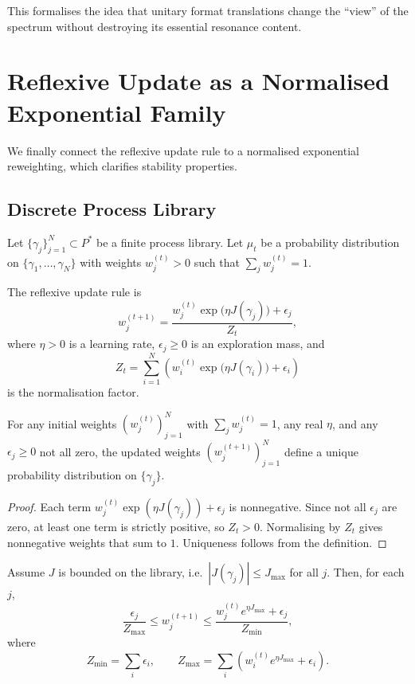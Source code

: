 \documentclass[11pt]{article}
\begin{document}
This formalises the idea that unitary format translations change the ``view'' of the spectrum without destroying its essential resonance content.

\section{Reflexive Update as a Normalised Exponential Family}

We finally connect the reflexive update rule to a normalised exponential reweighting, which clarifies stability properties.

\subsection{Discrete Process Library}

Let $\{\gamma_j\}_{j=1}^N \subset P^\ast$ be a finite process library.
Let $\mu_t$ be a probability distribution on $\{\gamma_1,\dots,\gamma_N\}$ with weights $w_j^{(t)}>0$ such that $\sum_j w_j^{(t)}=1$.

The reflexive update rule is
\[
w_j^{(t+1)} = \frac{w_j^{(t)} \exp\bigl(\eta J(\gamma_j)\bigr) + \epsilon_j}{Z_t},
\]
where $\eta>0$ is a learning rate, $\epsilon_j\geq 0$ is an exploration mass, and
\[
Z_t = \sum_{i=1}^N \left(w_i^{(t)} \exp\bigl(\eta J(\gamma_i)\bigr) + \epsilon_i\right)
\]
is the normalisation factor.

\begin{proposition}
\label{prop:reflexive-existence}
For any initial weights $(w_j^{(t)})_{j=1}^N$ with $\sum_j w_j^{(t)}=1$, any real $\eta$, and any $\epsilon_j\geq 0$ not all zero, the updated weights $(w_j^{(t+1)})_{j=1}^N$ define a unique probability distribution on $\{\gamma_j\}$.
\end{proposition}

\begin{proof}
Each term $w_j^{(t)} \exp(\eta J(\gamma_j)) + \epsilon_j$ is nonnegative.
Since not all $\epsilon_j$ are zero, at least one term is strictly positive, so $Z_t>0$.
Normalising by $Z_t$ gives nonnegative weights that sum to $1$.
Uniqueness follows from the definition.
\end{proof}

\begin{proposition}
\label{prop:reflexive-bounds}
Assume $J$ is bounded on the library, i.e.\ $|J(\gamma_j)|\leq J_{\max}$ for all $j$.
Then, for each $j$,
\[
\frac{\epsilon_j}{Z_{\max}} \leq w_j^{(t+1)} \leq \frac{w_j^{(t)} e^{\eta J_{\max}} + \epsilon_j}{Z_{\min}},
\]
where
\[
Z_{\min} = \sum_i \epsilon_i, \qquad
Z_{\max} = \sum_i \left(w_i^{(t)} e^{\eta J_{\max}} + \epsilon_i\right).
\]
\end{proposition}
\end{document}
